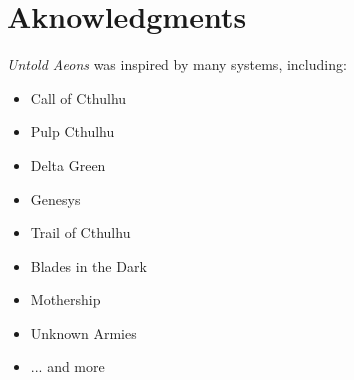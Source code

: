 \documentclass[
    statementpaper, %
    10pt, %
    oneside, 
    onecolumn, %
    openany, %
]{memoir}
\begin{document}
{        %
        
        \section*{Aknowledgments}
        \textit{Untold Aeons} was inspired by many systems, including:
        \begin{multicols}{3}
            \begin{itemize}[wide, label={}, itemindent=0pt, before=\itshape]
                \item Call of Cthulhu %
                \item Pulp Cthulhu
                \item Delta Green
                \item Genesys
                \item Trail of Cthulhu
                \item Blades in the Dark
                \item Mothership
                \item Unknown Armies
                \item ... and more
            \end{itemize}
        \end{multicols}
        \vspace{-0.35in} %
    }
\end{document}
